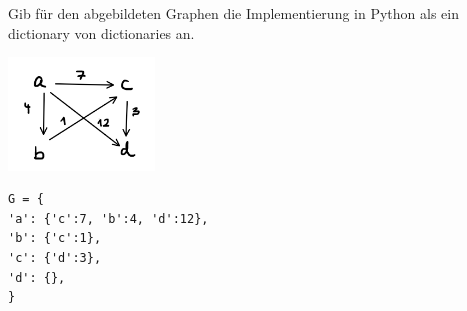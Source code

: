 ﻿\question[3]
Gib für den abgebildeten Graphen die Implementierung in Python als
ein dictionary von dictionaries an.

\includegraphics[height=3cm]{../Graphen/Aufgaben/gewichtet_03/gewichtet_03.png}
\begin{solutionbox}{5cm}
\begin{lstlisting}
G = {
'a': {'c':7, 'b':4, 'd':12},
'b': {'c':1},
'c': {'d':3},
'd': {},
}
\end{lstlisting}
\end{solutionbox}
